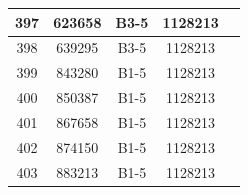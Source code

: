 \documentclass[UTF8,10pt,a4paper,fontset=fandol]{ctexart}
\newcommand{\fieldvalue}[1]{#1}
\begin{document}
\begin{center}
\begin{tabular}{|c|c|c|c|c|}
\fieldvalue{397} &
\fieldvalue{623658} &
\fieldvalue{B3-5} &
\fieldvalue{1128213} & \\ \hline

\fieldvalue{398} &
\fieldvalue{639295} &
\fieldvalue{B3-5} &
\fieldvalue{1128213} & \\ \hline

\fieldvalue{399} &
\fieldvalue{843280} &
\fieldvalue{B1-5} &
\fieldvalue{1128213} & \\ \hline

\fieldvalue{400} &
\fieldvalue{850387} &
\fieldvalue{B1-5} &
\fieldvalue{1128213} & \\ \hline

\fieldvalue{401} &
\fieldvalue{867658} &
\fieldvalue{B1-5} &
\fieldvalue{1128213} & \\ \hline

\fieldvalue{402} &
\fieldvalue{874150} &
\fieldvalue{B1-5} &
\fieldvalue{1128213} & \\ \hline

\fieldvalue{403} &
\fieldvalue{883213} &
\fieldvalue{B1-5} &
\fieldvalue{1128213} & \\ \hline


\end{tabular}
\end{center}
\end{document}
